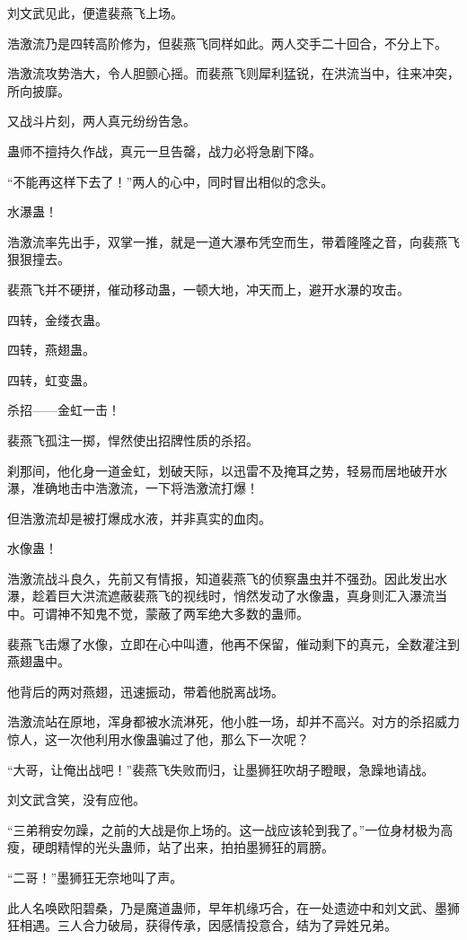 \begin{this_body}
刘文武见此，便遣裴燕飞上场。

浩激流乃是四转高阶修为，但裴燕飞同样如此。两人交手二十回合，不分上下。

浩激流攻势浩大，令人胆颤心摇。而裴燕飞则犀利猛锐，在洪流当中，往来冲突，所向披靡。

又战斗片刻，两人真元纷纷告急。

蛊师不擅持久作战，真元一旦告罄，战力必将急剧下降。

“不能再这样下去了！”两人的心中，同时冒出相似的念头。

水瀑蛊！

浩激流率先出手，双掌一推，就是一道大瀑布凭空而生，带着隆隆之音，向裴燕飞狠狠撞去。

裴燕飞并不硬拼，催动移动蛊，一顿大地，冲天而上，避开水瀑的攻击。

四转，金缕衣蛊。

四转，燕翅蛊。

四转，虹变蛊。

杀招——金虹一击！

裴燕飞孤注一掷，悍然使出招牌性质的杀招。

刹那间，他化身一道金虹，划破天际，以迅雷不及掩耳之势，轻易而居地破开水瀑，准确地击中浩激流，一下将浩激流打爆！

但浩激流却是被打爆成水液，并非真实的血肉。

水像蛊！

浩激流战斗良久，先前又有情报，知道裴燕飞的侦察蛊虫并不强劲。因此发出水瀑，趁着巨大洪流遮蔽裴燕飞的视线时，悄然发动了水像蛊，真身则汇入瀑流当中。可谓神不知鬼不觉，蒙蔽了两军绝大多数的蛊师。

裴燕飞击爆了水像，立即在心中叫遭，他再不保留，催动剩下的真元，全数灌注到燕翅蛊中。

他背后的两对燕翅，迅速振动，带着他脱离战场。

浩激流站在原地，浑身都被水流淋死，他小胜一场，却并不高兴。对方的杀招威力惊人，这一次他利用水像蛊骗过了他，那么下一次呢？

“大哥，让俺出战吧！”裴燕飞失败而归，让墨狮狂吹胡子瞪眼，急躁地请战。

刘文武含笑，没有应他。

“三弟稍安勿躁，之前的大战是你上场的。这一战应该轮到我了。”一位身材极为高瘦，硬朗精悍的光头蛊师，站了出来，拍拍墨狮狂的肩膀。

“二哥！”墨狮狂无奈地叫了声。

此人名唤欧阳碧桑，乃是魔道蛊师，早年机缘巧合，在一处遗迹中和刘文武、墨狮狂相遇。三人合力破局，获得传承，因感情投意合，结为了异姓兄弟。


\end{this_body}
